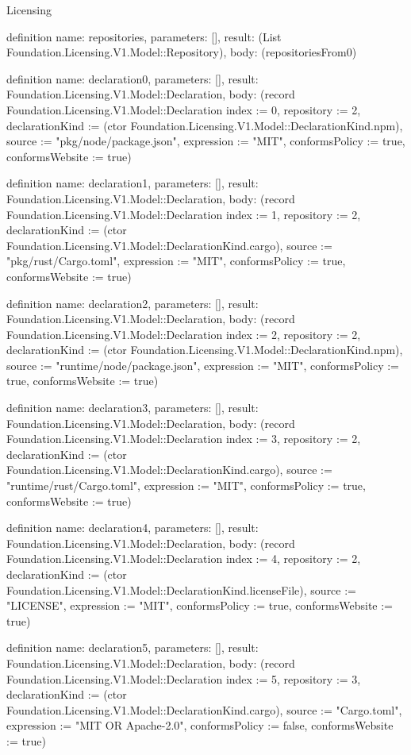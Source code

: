 \begin{lexlean}{Licensing}
\begin{semanticmodule}
definition{
  name: repositories,
  parameters: [],
  result: (List Foundation.Licensing.V1.Model::Repository),
  body: (repositoriesFrom0)
}

definition{
  name: declaration0,
  parameters: [],
  result: Foundation.Licensing.V1.Model::Declaration,
  body: (record Foundation.Licensing.V1.Model::Declaration {index := 0, repository := 2, declarationKind := (ctor Foundation.Licensing.V1.Model::DeclarationKind.npm), source := "pkg/node/package.json", expression := "MIT", conformsPolicy := true, conformsWebsite := true})
}

definition{
  name: declaration1,
  parameters: [],
  result: Foundation.Licensing.V1.Model::Declaration,
  body: (record Foundation.Licensing.V1.Model::Declaration {index := 1, repository := 2, declarationKind := (ctor Foundation.Licensing.V1.Model::DeclarationKind.cargo), source := "pkg/rust/Cargo.toml", expression := "MIT", conformsPolicy := true, conformsWebsite := true})
}

definition{
  name: declaration2,
  parameters: [],
  result: Foundation.Licensing.V1.Model::Declaration,
  body: (record Foundation.Licensing.V1.Model::Declaration {index := 2, repository := 2, declarationKind := (ctor Foundation.Licensing.V1.Model::DeclarationKind.npm), source := "runtime/node/package.json", expression := "MIT", conformsPolicy := true, conformsWebsite := true})
}

definition{
  name: declaration3,
  parameters: [],
  result: Foundation.Licensing.V1.Model::Declaration,
  body: (record Foundation.Licensing.V1.Model::Declaration {index := 3, repository := 2, declarationKind := (ctor Foundation.Licensing.V1.Model::DeclarationKind.cargo), source := "runtime/rust/Cargo.toml", expression := "MIT", conformsPolicy := true, conformsWebsite := true})
}

definition{
  name: declaration4,
  parameters: [],
  result: Foundation.Licensing.V1.Model::Declaration,
  body: (record Foundation.Licensing.V1.Model::Declaration {index := 4, repository := 2, declarationKind := (ctor Foundation.Licensing.V1.Model::DeclarationKind.licenseFile), source := "LICENSE", expression := "MIT", conformsPolicy := true, conformsWebsite := true})
}

definition{
  name: declaration5,
  parameters: [],
  result: Foundation.Licensing.V1.Model::Declaration,
  body: (record Foundation.Licensing.V1.Model::Declaration {index := 5, repository := 3, declarationKind := (ctor Foundation.Licensing.V1.Model::DeclarationKind.cargo), source := "Cargo.toml", expression := "MIT OR Apache-2.0", conformsPolicy := false, conformsWebsite := true})
}


\end{semanticmodule}
\end{lexlean}
